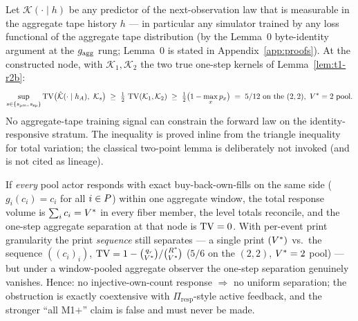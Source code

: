 
\begin{corollary}
\label{cor:t1-r2d}
Let $\hat{\mathcal{K}}(\cdot \mid h)$ be any predictor of the next-observation law
that is measurable in the aggregate tape history $h$ --- in particular any
simulator trained by any loss functional of the aggregate tape distribution
(by the Lemma~0 byte-identity argument at the $g_{\mathrm{agg}}$ rung; Lemma~0 is
stated in Appendix~\ref{app:proofs}). At the
constructed node, with $\mathcal{K}_1, \mathcal{K}_2$ the two true one-step
kernels of Lemma~\ref{lem:t1-r2b}:
\[
\sup_{s \in \{s_{\mathrm{pm}},\, s_{\mathrm{sp}}\}}
\operatorname{TV}\!\big(\hat{\mathcal{K}}(\cdot \mid h_A),\ \mathcal{K}_s\big)
\;\geq\; \tfrac{1}{2}\,\operatorname{TV}(\mathcal{K}_1, \mathcal{K}_2)
\;\geq\; \tfrac{1}{2}\big(1 - \max_x p_x\big)
\;=\; 5/12
\ \text{on the } (2,2),\ V^{*} = 2 \text{ pool}.
\]
No aggregate-tape training signal can constrain the forward law on the
identity-responsive stratum. The inequality is proved inline from the
triangle inequality for total variation; the classical two-point lemma is
deliberately not invoked (and is not cited as lineage).
\end{corollary}


\begin{proposition}
\label{prop:t1-sharp}
If \emph{every} pool actor responds with exact buy-back-own-fills on the
same side ($g_i(c_i) = c_i$ for all $i \in P$) within one aggregate
window, the total response volume is $\sum_i c_i = V^{*}$ in every fiber
member, the level totals reconcile, and the one-step aggregate separation at
that node is $\operatorname{TV} = 0$. With per-event print granularity the print
\emph{sequence} still separates --- a single print $(V^{*})$ vs.\ the
sequence $((c_i)_i)$, $\operatorname{TV} = 1 - \binom{q_r}{V^{*}}/\binom{R^{*}}{V^{*}}$
($5/6$ on the $(2,2)$, $V^{*} = 2$ pool) --- but under a window-pooled
aggregate observer the one-step separation genuinely vanishes. Hence: no
injective-own-count response $\Rightarrow$ no uniform separation; the
obstruction is exactly coextensive with $\Pi_{\mathrm{resp}}$-style active
feedback, and the stronger ``all M1$+$'' claim is false and must never be
made.
\end{proposition}


